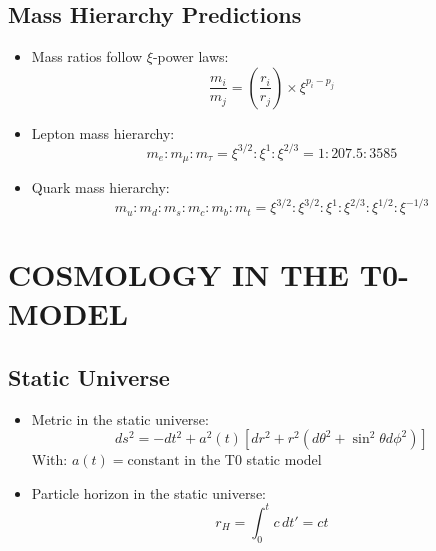 \documentclass[12pt,a4paper]{article}
\begin{document}
\subsection{Mass Hierarchy Predictions}
\begin{itemize}
	\item Mass ratios follow $\xi$-power laws:
	\begin{equation}
		\frac{m_i}{m_j} = \left(\frac{r_i}{r_j}\right) \times \xi^{p_i - p_j}
	\end{equation}
	
	\item Lepton mass hierarchy:
	\begin{equation}
		m_e : m_\mu : m_\tau = \xi^{3/2} : \xi^1 : \xi^{2/3} = 1 : 207.5 : 3585
	\end{equation}
	
	\item Quark mass hierarchy:
	\begin{equation}
		m_u : m_d : m_s : m_c : m_b : m_t = \xi^{3/2} : \xi^{3/2} : \xi^1 : \xi^{2/3} : \xi^{1/2} : \xi^{-1/3}
	\end{equation}
\end{itemize}	
	\section{COSMOLOGY IN THE T0-MODEL}

\subsection{Static Universe}
\begin{itemize}
	\item Metric in the static universe:
	\begin{equation}
		ds^2 = -dt^2 + a^2(t)[dr^2 + r^2(d\theta^2 + \sin^2\theta d\phi^2)]
	\end{equation}
	With: $a(t) = \text{constant}$ in the T0 static model
	
	\item Particle horizon in the static universe:
	\begin{equation}
		r_H = \int_0^t c \, dt' = ct
	\end{equation}
\end{itemize}
\end{document}
